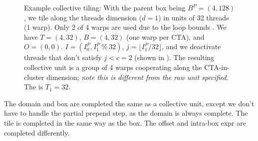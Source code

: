 \begin{figure}[!b]
\caption{Example collective tiling: With the parent box being $B^P=(4, 128)$, we tile along the threads dimension ($d = 1$) in units of 32 threads (1 warp). Only 2 of 4 warps are used due to the loop bounds .
We have $T = (4, 32)$, $B = (4, 32)$ (one warp per CTA), and $O = (0, 0)$.
$I = (I^P_0, I^P_1~\%~32)$, $j = \lfloor I^P_1 / 32 \rfloor$, and we deactivate threads that don't satisfy $j < c = 2$ (shown in ).
The resulting collective unit is a group of 4 warps cooperating along the CTA-in-cluster dimension; \textit{note this is different from the raw  unit specified}.
The  is $T_1 = 32$.
}
\label{fig:warp_tiling}
\end{figure}

\filbreak
{}

The domain and box are completed the same as a collective unit, except we don't have to handle the partial prepend step, as the domain is always complete.
The tile is completed in the same way as the box.
The offset and intra-box expr are completed differently.

